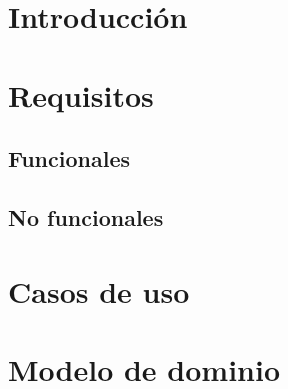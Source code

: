 \section{Introducción}

\section{Requisitos}
\subsection{Funcionales}
\subsection{No funcionales}

\section{Casos de uso}

\section{Modelo de dominio}
